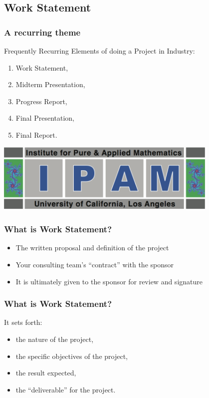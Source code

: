 \documentclass[hyperref={colorlinks=false},compress,handout,10pt]{beamer}
\let\olditem\item
\renewcommand{\item}{\setlength{\itemsep}{0.5\baselineskip}\olditem}
\begin{document}
\subsection{Work Statement}
\begin{frame}
    \frametitle{A recurring theme}
    Frequently Recurring Elements of doing a Project in Industry:
    \vspace{7pt}
             \begin{enumerate}
                 \item Work Statement,
                 \item Midterm Presentation,
                 \item Progress Report,
                 \item Final Presentation,
                 \item Final Report.
             \end{enumerate}
    \begin{center}
        \href{http://www.ipam.ucla.edu/programs/rips2011/}{
        \includegraphics[width=0.8\textwidth]{images/ipam}}        
    \end{center}
\end{frame}

\begin{frame}
    \frametitle{What is Work Statement?}
    \begin{itemize}
        \item The written proposal and definition of the project
            \vspace{1cm}
        \item Your consulting team's ``contract'' with the sponsor
            \vspace{1cm}
        \item It is ultimately given to the sponsor for review and signature
    \end{itemize}
\end{frame}



\begin{frame}
    \frametitle{What is Work Statement?}
It sets forth: 
    \begin{itemize}
        \item the nature of the project,
        \item the specific objectives of the project, 
        \item the result expected, 
        \item the ``deliverable'' for the project.
    \end{itemize}
\end{frame}
\end{document}
